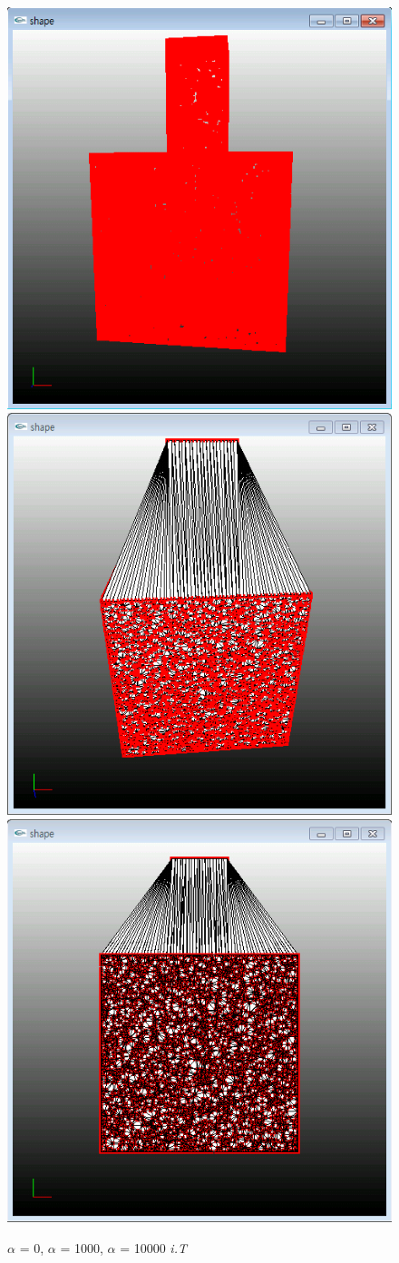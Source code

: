 \documentclass[11pt]{article}
\begin{document}
\begin{figure}[ht]
\includegraphics[width=.5\textwidth]{FIGS/alpha0-iT}
\hspace{1cm}
\includegraphics[width=.5\textwidth]{FIGS/alpha1000-iT}
\vspace{1cm}
\includegraphics[width=.5\textwidth]{FIGS/alpha10000-iT}
\caption{$\alpha$ = 0, $\alpha$ = 1000, $\alpha$ = 10000 \textit{i.T}}
\end{figure}
\end{document}
